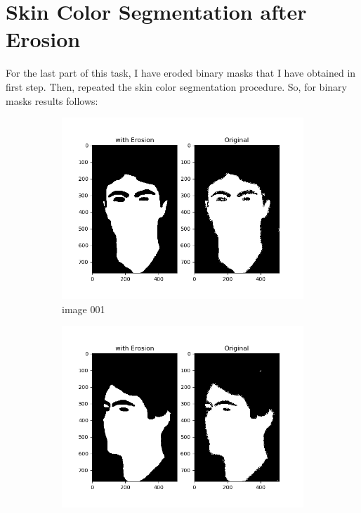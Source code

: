 \documentclass[11pt]{report}
\begin{document}
\section{Skin Color Segmentation after Erosion}

For the last part of this task, I have eroded binary masks that I have obtained in first step. Then, repeated the skin color segmentation procedure. So, for binary masks results follows:

\begin{figure}[H]
    \centering
    \begin{subfigure}{0.4\textwidth}
        \centering
        \includegraphics[width=\textwidth]{Task 2 Plots/bin_mask_erode_001.png}
        \caption{image 001}
        \label{fig:binmask_erode1}
    \end{subfigure}
    \begin{subfigure}{0.4\textwidth}
        \centering
        \includegraphics[width=\textwidth]{Task 2 Plots/bin_mask_erode_002.png}

\end{subfigure}
\end{figure}
\end{document}

